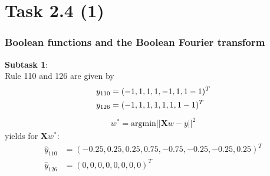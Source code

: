 \documentclass{beamer}
\begin{document}
\section{Task 2.4 (1)}


\begin{frame}
	\frametitle{Boolean functions and the Boolean Fourier transform}
	\textbf{Subtask 1}:\\
	Rule 110 and 126 are given by
	\begin{align*}
	y_{110} &= (-1,1,1,1,-1,1,1-1)^T \\\bigskip
	y_{126} &=  (-1,1,1,1,1,1,1-1)^T
	\end{align*}
	\begin{align*}
	w^* = \text{argmin}||\mathbf{X} w - y||^2	
	\end{align*}
	yields for $\mathbf{X}w^*$:
	\begin{align*}
	\hat{y}_{110}&= (-0.25,  0.25,  0.25,  0.75, -0.75, -0.25, -0.25,  0.25)^T\\
	\hat{y}_{126}&= (0,0,0,0,0,0,0,0)^T
	\end{align*}
\end{frame}
\end{document}
